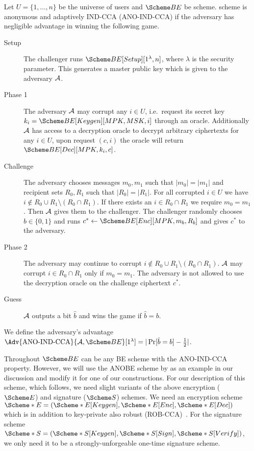 \begin{definition}\label{ANO-IND-CCA}
  Let \(U = \{1, \ldots, n\}\) be the universe of users and \(\BE\) be  
  scheme.
   scheme is anonymous and adaptively IND-CCA (ANO-IND-CCA) if the 
  adversary has negligible advantage in winning the following game.
  \begin{description}
    \item[Setup] The challenger runs \(\BE[Setup][1^\lambda, n]\), where 
      \(\lambda\) is the security parameter.
      This generates a master public key which is given to the adversary 
      \(\A\).

    \item[Phase 1] The adversary \(\A\) may corrupt any \(i\in U\), i.e.\ 
      request its secret key \(k_i = \BE[Keygen][MPK, MSK, i]\) through an 
      oracle.
      Additionally \(\A\) has access to a decryption oracle to decrypt 
      arbitrary ciphertexts for any \(i\in U\), upon request \((c, i)\) the 
      oracle will return \(\BE[Dec][MPK, k_i, c]\).

    \item[Challenge] The adversary chooses messages \(m_0, m_1\) such that 
      \(|m_0| = |m_1|\) and recipient sets \(R_0, R_1\) such that \(|R_0| 
        = |R_1|\).
      For all corrupted \(i\in U\) we have \(i\notin R_0\cup R_1\setminus 
        (R_0\cap R_1)\).
      If there exists an \(i\in R_0\cap R_1\) we require \(m_0 = m_1\).
      Then \(\A\) gives them to the challenger.
      The challenger randomly chooses \(b\in \{0, 1\}\) and runs \(c^*\gets 
        \BE[Enc][MPK, m_b, R_b]\) and gives \(c^*\) to the adversary.

    \item[Phase 2] The adversary may continue to corrupt \(i\notin R_0\cup 
        R_1\setminus (R_0\cap R_1)\).
      \(\A\) may corrupt \(i\in R_0\cap R_1\) only if \(m_0 = m_1\).
      The adversary is not allowed to use the decryption oracle on the 
      challenge ciphertext \(c^*\).

    \item[Guess] \(\A\) outputs a bit \(\hat{b}\) and wins the game if 
      \(\hat{b} = b\).

  \end{description}
  We define the adversary's advantage \(\Adv{\text{ANO-IND-CCA}}{\A, 
      \BE}[1^\lambda] = |\Pr[ \hat{b} = b ] - \frac{1}{2}|\).
\end{definition}

Throughout \(\BE\) can be any \ac{BE} scheme with the ANO-IND-CCA property.
However, we will use the \ac{ANOBE} scheme by \citet{ANOBE} as an example in 
our discussion and modify it for one of our constructions.
For our description of this scheme, which follows, we need slight variants of 
the above encryption (\(\E\)) and signature (\(\S\)) schemes.
We need an encryption scheme \(\E* = (\E*[Keygen], \E*[Enc], \E*[Dec])\) which 
is in addition to key-private also robust (ROB-CCA)~\cite{RobustEncryption}.
For the signature scheme \(\S* = (\S*[Keygen], \S*[Sign], \S*[Verify])\), we 
only need it to be a strongly-unforgeable one-time signature scheme.
